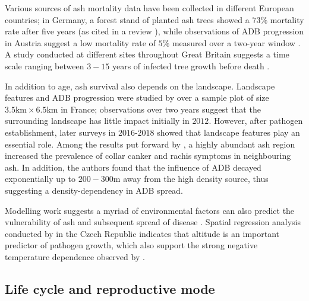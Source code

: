Various sources of ash mortality data have been collected in different European countries;
in Germany, a forest stand of planted ash trees showed a $73\%$
mortality rate after five years \cite{langer2015ash} (as cited in a review
\cite{enderle2017ash}), while observations of ADB progression in Austria
suggest a low mortality rate of $5\%$ measured over a two-year window \cite{kessler2012dieback}. 
A study conducted at different sites throughout Great Britain suggests a time scale ranging between 
$3-15$ years of infected tree growth before death \cite{wylder2018evidence}.

In addition to age, ash survival also depends on the landscape. 
Landscape features and ADB progression were studied by \cite{https://doi.org/10.1111/1365-2745.13383} 
over a sample plot of size  $\mathrm{3.5km \times 6.5 km}$ in France; observations over two years
suggest that the surrounding landscape has little impact initially in $2012$. However, after pathogen establishment, 
later surveys in $2016$-$2018$ showed that landscape features play an essential role.
Among the results put forward by \cite{https://doi.org/10.1111/1365-2745.13383}, 
a highly abundant ash region increased the prevalence of collar canker and rachis symptoms in neighbouring ash.
In addition, the authors found that the influence of ADB decayed exponentially up to $200-300\mathrm{m}$ away from the high density source,
thus suggesting a density-dependency in ADB spread.

Modelling work suggests a myriad of environmental factors can also predict the
vulnerability of ash and subsequent spread of disease \cite{dal2014risk}.
Spatial regression analysis conducted by \cite{chumanova2019predicting} in the Czech Republic indicates that altitude 
is an important predictor of pathogen growth, which also support the strong negative temperature dependence observed by \cite{hauptman2013temperature}.

\subsection{Life cycle and reproductive mode}

